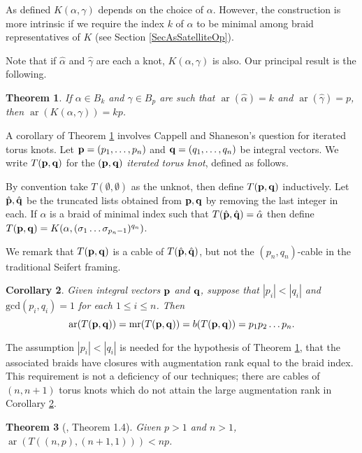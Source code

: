 \documentclass[11pt]{amsart}
\def\s{{\sigma}}
\def\ar{\operatorname{ar}}
\def\mr{\operatorname{mr}}
\newtheorem{thm}{Theorem}[section]
\newtheorem{cor}[thm]{Corollary}
\theoremstyle{definition}
\begin{document}
As defined $K(\alpha,\gamma)$ depends on the choice of $\alpha$. However, the construction is more intrinsic if we require the index $k$ of $\alpha$ to be minimal among braid representatives of $K$ (see Section \ref{SecAsSatelliteOp}). 

Note that if $\hat{\alpha}$ and $\hat{\gamma}$ are each a knot, $K(\alpha,\gamma)$ is also. Our principal result is the following.

\begin{thm}\label{main}
If $\alpha\in B_k$ and $\gamma\in B_p$ are such that $\ar(\hat{\alpha})=k$ and $\ar(\hat{\gamma})=p$, then $\ar(K(\alpha,\gamma))=kp$.
\end{thm}

A corollary of Theorem \ref{main} involves Cappell and Shaneson's question for iterated torus knots. Let ${\bf p}=(p_1,\ldots,p_n)$ and ${\bf q}=(q_1,\ldots,q_n)$ be integral vectors. We write $T({\bf p},{\bf q})$ for the $({\bf p},{\bf q})$ \emph{iterated torus knot}, defined as follows. 

By convention take $T(\emptyset,\emptyset)$ as the unknot, then define $T({\bf p},{\bf q})$ inductively. Let $\hat{\bf p}, \hat{\bf q}$ be the truncated lists obtained from ${\bf p},{\bf q}$ by removing the last integer in each. If $\alpha$ is a braid of minimal index such that $T(\hat{\bf p},\hat{\bf q}) = \hat{\alpha}$ then define $T({\bf p},{\bf q}) = K(\alpha,(\s_1\ldots\s_{p_n-1})^{q_n})$. 

We remark that $T({\bf p},{\bf q})$ is a cable of $T(\hat{\bf p},\hat{\bf q})$, but not the $(p_n,q_n)$-cable in the traditional Seifert framing.

\begin{cor}\label{cor:iteratedCables}
Given integral vectors ${\bf p}$ and ${\bf q}$, suppose that $|p_i|<|q_i|$ and $\text{gcd}(p_i,q_i)=1$ for each $1\le i\le n$. Then 
      \[\ar(T({\bf p},{\bf q}))=\mr(T({\bf p},{\bf q})) = b(T({\bf p},{\bf q}))=p_1p_2\ldots p_n.\]
\end{cor}

The assumption $|p_i|<|q_i|$ is needed for the hypothesis of Theorem \ref{main}, that the associated braids have closures with augmentation rank equal to the braid index. This requirement is not a deficiency of our techniques; there are cables of $(n,n+1)$ torus knots which do not attain the large augmentation rank in Corollary \ref{cor:iteratedCables}.

\begin{thm}[\cite{CH}, Theorem 1.4]\label{ThmNNPlus1}Given $p>1$ and $n>1$, $\ar(T((n,p),(n+1,1))) < np$.
\end{thm}
\end{document}
